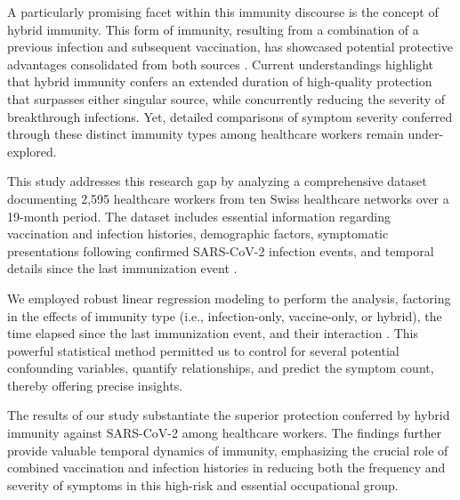 \documentclass[11pt]{article}
\begin{document}
A particularly promising facet within this immunity discourse is the concept of hybrid immunity. This form of immunity, resulting from a combination of a previous infection and subsequent vaccination, has showcased potential protective advantages consolidated from both sources \cite{Goldberg2021ProtectionAW, Hui2022HybridIA}. Current understandings highlight that hybrid immunity confers an extended duration of high-quality protection that surpasses either singular source, while concurrently reducing the severity of breakthrough infections. Yet, detailed comparisons of symptom severity conferred through these distinct immunity types among healthcare workers remain under-explored.

This study addresses this research gap by analyzing a comprehensive dataset documenting 2,595 healthcare workers from ten Swiss healthcare networks over a 19-month period. The dataset includes essential information regarding vaccination and infection histories, demographic factors, symptomatic presentations following confirmed SARS-CoV-2 infection events, and temporal details since the last immunization event \cite{Maheu2019ASI, Cui2018PathologicalMM}.

We employed robust linear regression modeling to perform the analysis, factoring in the effects of immunity type (i.e., infection-only, vaccine-only, or hybrid), the time elapsed since the last immunization event, and their interaction \cite{Alaux2011NutrigenomicsIH, Tropberger2015MappingOH}. This powerful statistical method permitted us to control for several potential confounding variables, quantify relationships, and predict the symptom count, thereby offering precise insights.

The results of our study substantiate the superior protection conferred by hybrid immunity against SARS-CoV-2 among healthcare workers. The findings further provide valuable temporal dynamics of immunity, emphasizing the crucial role of combined vaccination and infection histories in reducing both the frequency and severity of symptoms in this high-risk and essential occupational group.
\end{document}
